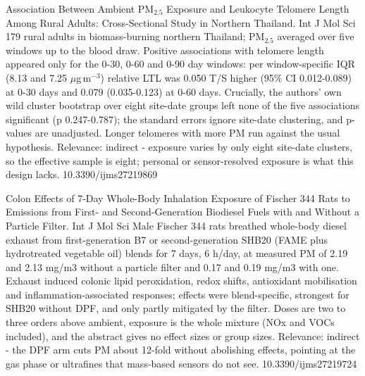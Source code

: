 \documentclass[10pt]{article}
\begin{document}
{Association Between Ambient PM$_{2.5}$ Exposure and Leukocyte Telomere Length Among Rural Adults: Cross-Sectional Study in Northern Thailand.}
{Int J Mol Sci}
{179 rural adults in biomass-burning northern Thailand; PM$_{2.5}$ averaged over five windows up to the blood draw. Positive associations with telomere length appeared only for the 0-30, 0-60 and 0-90 day windows: per window-specific IQR (8.13 and 7.25 $\mu$g\,m$^{-3}$) relative LTL was 0.050 T/S higher (95\% CI 0.012-0.089) at 0-30 days and 0.079 (0.035-0.123) at 0-60 days. Crucially, the authors' own wild cluster bootstrap over eight site-date groups left none of the five associations significant (p 0.247-0.787); the standard errors ignore site-date clustering, and p-values are unadjusted. Longer telomeres with more PM run against the usual hypothesis. Relevance: indirect - exposure varies by only eight site-date clusters, so the effective sample is eight; personal or sensor-resolved exposure is what this design lacks.}
{10.3390/ijms27219869}

{Colon Effects of 7-Day Whole-Body Inhalation Exposure of Fischer 344 Rats to Emissions from First- and Second-Generation Biodiesel Fuels with and Without a Particle Filter.}
{Int J Mol Sci}
{Male Fischer 344 rats breathed whole-body diesel exhaust from first-generation B7 or second-generation SHB20 (FAME plus hydrotreated vegetable oil) blends for 7 days, 6 h/day, at measured PM of 2.19 and 2.13 mg/m3 without a particle filter and 0.17 and 0.19 mg/m3 with one. Exhaust induced colonic lipid peroxidation, redox shifts, antioxidant mobilisation and inflammation-associated responses; effects were blend-specific, strongest for SHB20 without DPF, and only partly mitigated by the filter. Doses are two to three orders above ambient, exposure is the whole mixture (NOx and VOCs included), and the abstract gives no effect sizes or group sizes. Relevance: indirect - the DPF arm cuts PM about 12-fold without abolishing effects, pointing at the gas phase or ultrafines that mass-based sensors do not see.}
{10.3390/ijms27219724}
\end{document}
